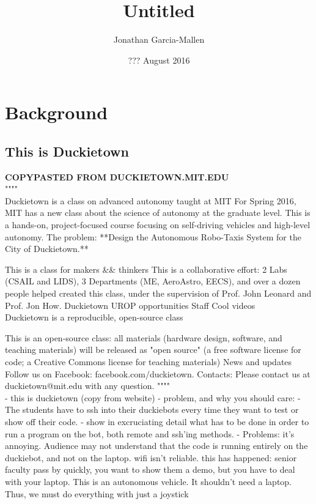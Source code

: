 \documentclass{article}
\title{Untitled}
\author{Jonathan Garcia-Mallen}
\date{??? August 2016}
\begin{document}
\lstset{language=Python,
  numbers=left,
  stepnumber=3,    
  firstnumber=1,
  numberfirstline=true
}
\maketitle
\tableofcontents
\section{Background } 
\subsection{This is Duckietown}
\textbf{COPYPASTED FROM DUCKIETOWN.MIT.EDU}\\
""""\\
Duckietown is a class on advanced autonomy taught at MIT
For Spring 2016, MIT has a new class about the science of autonomy at the graduate level. This is a hands-on, project-focused course focusing on self-driving vehicles and high-level autonomy. The problem: **Design the Autonomous Robo-Taxis System for the City of Duckietown.**

    This is a class for makers \&\& thinkers
    This is a collaborative effort: 2 Labs (CSAIL and LIDS), 3 Departments (ME, AeroAstro, EECS), and over a dozen people helped created this class, under the supervision of Prof. John Leonard and Prof. Jon How.
    Duckietown UROP opportunities
    Staff
    Cool videos
\\
Duckietown is a reproducible, open-source class

    This is an open-source class: all materials (hardware design, software, and teaching materials) will be released as "open source" (a free software license for code; a Creative Commons license for teaching materials)
    News and updates
    Follow us on Facebook: facebook.com/duckietown.
    Contacts: Please contact us at duckietown@mit.edu with any question.
""""\\


- this is duckietown (copy from website)
- problem, and why you should care:
    - The students have to ssh into their duckiebots every time they want to 
      test or show off their code.
        - show in excruciating detail what has to be done in order to run a 
        program on the bot, both remote and ssh'ing methods.
    - Problems: it's annoying.  Audience may not understand that the code is
      running entirely on the duckiebot, and not on the laptop. wifi isn't 
      reliable. this has happened: senior faculty pass by quickly, you want
      to show them a demo, but you have to deal with your laptop. This is an
      autonomous vehicle. It shouldn't need a laptop. Thus, we must do
      everything with just a joystick
\end{document}

